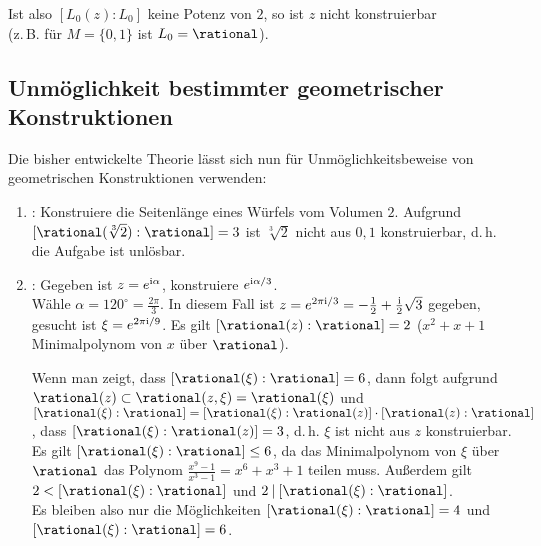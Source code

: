\begin{Bem}
    Ist also $[L_0(z):L_0]$ keine Potenz von $2$, so ist $z$ nicht
    konstruierbar\\
    (z.\,B. für $M = \{0, 1\}$ ist $L_0 = \rational$).
\end{Bem}

\pagebreak

\subsection{%
    Unmöglichkeit bestimmter geometrischer Konstruktionen%
}

\begin{Bem}
    Die bisher entwickelte Theorie lässt sich nun für
    Unmöglichkeitsbeweise von geometrischen Konstruktionen verwenden:
    \begin{enumerate}
        \item
        :
        Konstruiere die Seitenlänge eines Würfels vom Volumen $2$.
        Aufgrund $[\rational(\sqrt[3]{2}):\rational] = 3$ ist
        $\sqrt[3]{2}$ nicht aus $0, 1$ konstruierbar, d.\,h.
        die Aufgabe ist unlösbar.

        \item
        :
        Gegeben ist $z = e^{\text{i}\alpha}$, konstruiere $e^{\text{i}\alpha/3}$.\\
        Wähle $\alpha = 120^\circ = \frac{2\pi}{3}$.
        In diesem Fall ist
        $z = e^{2\pi\text{i}/3} = -\frac{1}{2} + \frac{\text{i}}{2} \sqrt{3}$ gegeben,
        gesucht ist $\xi = e^{2\pi\text{i}/9}$.
        Es gilt $[\rational(z):\rational] = 2$
        ($x^2 + x + 1$ Minimalpolynom von $x$ über $\rational$).

        Wenn man zeigt, dass $[\rational(\xi):\rational] = 6$,
        dann folgt aufgrund
        $\rational(z) \subset \rational(z, \xi) = \rational(\xi)$ und\\
        $[\rational(\xi):\rational] =
        [\rational(\xi):\rational(z)] \cdot [\rational(z):\rational]$,
        dass $[\rational(\xi):\rational(z)] = 3$,
        d.\,h. $\xi$ ist nicht aus $z$ konstruierbar.
        Es gilt $[\rational(\xi):\rational] \le 6$, da
        das Minimalpolynom von $\xi$ über $\rational$
        das Polynom $\frac{x^9 - 1}{x^3 - 1} = x^6 + x^3 + 1$ teilen muss.
        Außerdem gilt $2 < [\rational(\xi):\rational]$
        und $2 \teilt [\rational(\xi):\rational]$.\\
        Es bleiben also nur die Möglichkeiten
        $[\rational(\xi):\rational] = 4$ und
        $[\rational(\xi):\rational] = 6$.


\end{enumerate}
\end{Bem}
